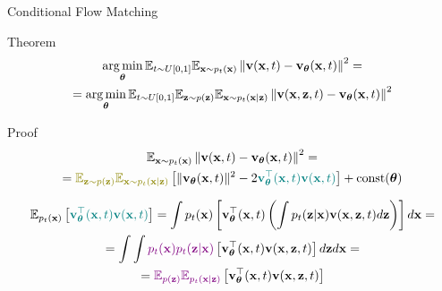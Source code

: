 \documentclass{beamer}
\renewcommand{\eqpause}{}
\renewcommand{\nextonslide}[1]{#1}
\begin{document}
\begin{frame}{Conditional Flow Matching}
	\begin{block}{Theorem}
		\vspace{-0.7cm}
		\begin{multline*}
			\operatorname*{arg\,min}_{\boldsymbol{\theta}} \mathbb{E}_{t \sim U[0, 1]} \mathbb{E}_{\mathbf{x} \sim p_t(\mathbf{x})}\left\| \mathbf{v}(\mathbf{x}, t) - \mathbf{v}_{\boldsymbol{\theta}}(\mathbf{x}, t) \right\|^2 = \\
			= \operatorname*{arg\,min}_{\boldsymbol{\theta}} \mathbb{E}_{t \sim U[0, 1]} \mathbb{E}_{\mathbf{z} \sim p(\mathbf{z})} \mathbb{E}_{\mathbf{x} \sim p_t(\mathbf{x} | \mathbf{z})}\left\| \mathbf{v}(\mathbf{x}, \mathbf{z}, t) - \mathbf{v}_{\boldsymbol{\theta}}(\mathbf{x}, t) \right\|^2
		\end{multline*}
		\vspace{-0.7cm}
	\end{block}
    \eqpause
	\begin{block}{Proof}
		\vspace{-0.5cm}
		{\small
		\begin{multline*}
			\bbE_{\bx \sim p_t(\bx)}\left\| \bv(\bx, t) - \bv_{\btheta}(\bx, t) \right\|^2 = \\ 
			= {\color{olive}\bbE_{\bz \sim p(\bz)} \bbE_{\bx \sim p_t(\bx | \bz)}}\left[\| \bv_{\btheta}(\bx, t) \|^2 - 2 {\color{teal}\bv_{\btheta}^\top(\bx, t)\bv(\bx, t)} \right] + \text{const}(\btheta)
		\end{multline*}
		}
		\eqpause
		\vspace{-1.0cm}
		{\small
		\begin{multline*}
			\bbE_{p_t(\bx)} \left[{\color{teal}\bv_{\btheta}^\top(\bx, t)\bv(\bx, t)} \right] = \int p_t(\bx) \left[\bv_{\btheta}^\top(\bx, t) \left( \int p_t(\bz | \bx)\bv(\bx, \bz, t)d\bz \right) \right] d\bx 
			\nextonslide{ = \\ = \int \int {\color{violet}p_t(\bx) p_t(\bz | \bx)} \left[\bv_{\btheta}^\top(\bx, t) \bv(\bx, \bz, t) \right] d\bz d\bx}
			\nextonslide{ = \\ = {\color{violet}\bbE_{p(\bz)} \bbE_{p_t(\bx | \bz)}} \left[\bv_{\btheta}^\top(\bx, t) \bv(\bx, \bz, t) \right]}
		\end{multline*}
		}
	\end{block}
\end{frame}
\end{document}
